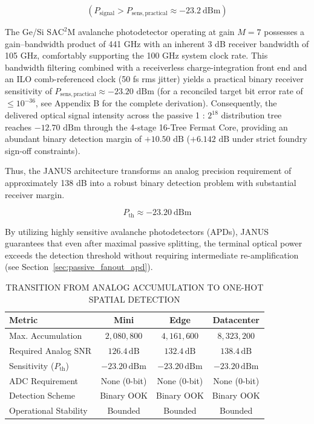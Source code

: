 \documentclass[journal]{IEEEtran}
\begin{document}
\begin{equation}
\left(
P_{\mathrm{signal}} > P_{\mathrm{sens,practical}}
\approx -23.2~\mathrm{dBm}
\right)
\end{equation}

The Ge/Si $\mathrm{SAC^2M}$ avalanche photodetector operating at gain $M = 7$ possesses a gain--bandwidth product of 441 GHz with an inherent 3 dB receiver bandwidth of 105 GHz, comfortably supporting the 100 GHz system clock rate. This bandwidth filtering combined with a receiverless charge-integration front end and an ILO comb-referenced clock (50 fs rms jitter) yields a practical binary receiver sensitivity of $P_{\mathrm{sens,practical}} \approx -23.20\text{ dBm}$ (for a reconciled target bit error rate of $\le 10^{-36}$, see Appendix B for the complete derivation). Consequently, the delivered optical signal intensity across the passive 1 : $2^{18}$ distribution tree reaches $-12.70\text{ dBm}$ through the 4-stage 16-Tree Fermat Core, providing an abundant binary detection margin of $+10.50\text{ dB}$ ($+6.142\text{ dB}$ under strict foundry sign-off constraints).

Thus, the JANUS architecture transforms an analog precision requirement of approximately 138 dB into a robust binary detection problem with substantial receiver margin.

\begin{equation}
P_{\mathrm{th}} \approx -23.20~\mathrm{dBm}
\end{equation}

By utilizing highly sensitive avalanche photodetectors (APDs), JANUS guarantees that even after maximal passive splitting, the terminal optical power exceeds the detection threshold without requiring intermediate re-amplification (see Section~\ref{sec:passive_fanout_apd}).

\begin{table}[htbp]
\centering
\footnotesize
\setlength{\tabcolsep}{2.5pt}
\renewcommand{\arraystretch}{1.15}
\caption{TRANSITION FROM ANALOG ACCUMULATION TO ONE-HOT SPATIAL DETECTION}
\label{tab:onehot_transition}
\begin{tabularx}{\columnwidth}{@{}Xccc@{}}
\toprule
\textbf{Metric} & \textbf{Mini} & \textbf{Edge} & \textbf{Datacenter} \\
\midrule
Max. Accumulation & $2{,}080{,}800$ & $4{,}161{,}600$ & $8{,}323{,}200$ \\
Required Analog SNR & $126.4\,\mathrm{dB}$ & $132.4\,\mathrm{dB}$ & $138.4\,\mathrm{dB}$ \\
Sensitivity ($P_{\mathrm{th}}$) & $-23.20\,\mathrm{dBm}$ & $-23.20\,\mathrm{dBm}$ & $-23.20\,\mathrm{dBm}$ \\
ADC Requirement & None (0-bit) & None (0-bit) & None (0-bit) \\
Detection Scheme & Binary OOK & Binary OOK & Binary OOK \\
Operational Stability & Bounded & Bounded & Bounded \\
\bottomrule
\end{tabularx}
\end{table}
\end{document}
